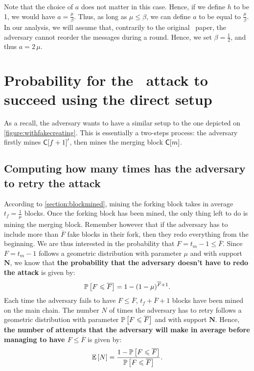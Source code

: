 Note that the choice of \(a\) does not matter in this case. Hence, if we define \(h\) to be 1, we would have \(a=\frac{\mu}{\beta}\). Thus, as long as \(\mu\leqslant\beta\), we can define \(a\) to be equal to \(\frac{\mu}{\beta}\). In our analysis, we will assume that, contrarily to the original \FC\ paper, the adversary cannot reorder the messages during a round. Hence, we set \(\beta=\frac12\), and thus \(a=2\,\mu\).

\section{Probability for the \cs\ attack to succeed using the direct setup}
\label{section:firstsetup}
    As a recall, the adversary wants to have a similar setup to the one depicted on \autoref{figure:withfakecreating}. This is essentially a two-steps process: the adversary firstly mines \(\Cindex{f+1}'\), then mines the merging block \(\Cindex{m}\). 
    
    \subsection{Computing how many times has the adversary to retry the attack}
    
    According to \autoref{section:blockmined}, mining the forking block takes in average \(t_f=\frac{1}{\mu}\) blocks. Once the forking block has been mined, the only thing left to do is mining the merging block. Remember however that if the adversary has to include more than \(\overline{F}\) fake blocks in their fork, then they redo everything from the beginning. We are thus interested in the probability that \(F=t_m-1\leqslant\overline{F}\). Since \(F=t_m-1\) follows a geometric distribution with parameter \(\mu\) and with support \(\mathbf{N}\), we know that \textbf{the probability that the adversary doesn't have to redo the attack} is given by:
    \[\P{F\leqslant\overline{F}} = 1 - (1-\mu)^{\overline{F}+1}.\]
    Each time the adversary fails to have \(F\leqslant\overline{F}\), \(t_f+\overline{F}+1\) blocks have been mined on the main chain. The number \(N\) of times the adversary has to retry follows a geometric distribution with parameter \(\P{F\leqslant\overline{F}}\) and with support \(\mathbf{N}\). Hence, \textbf{the number of attempts that the adversary will make in average before managing to have \(F\leqslant\overline{F}\)} is given by:
    \[\E{N}=\frac{1-\P{F\leqslant\overline{F}}}{\P{F\leqslant\overline{F}}}.\]
    
